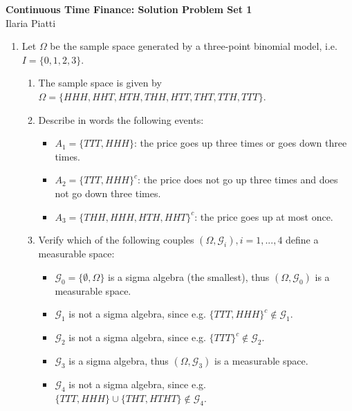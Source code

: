 \documentclass[11pt,a4,table]{article}
\begin{document}
\vspace*{-0.7in}

\begin{center}
 \textbf{Continuous Time Finance: Solution Problem Set 1} \\
Ilaria Piatti
\end{center} 


\begin{enumerate}
    \item Let $\Omega$ be the sample space generated by a three-point binomial model, i.e. $I=\{0,1,2,3\}$.
    
    \begin{enumerate}
        \item The sample space is given by $\Omega=\{HHH,HHT,HTH,THH,HTT, THT, TTH,TTT\}$.
        
        \item Describe in words the following events:
        \begin{itemize}
            \item $A_1=\{TTT,HHH\}$: the price goes up three times or goes down three times.
            \item $A_2=\{TTT,HHH\}^c$: the price does not go up three times and does not go down three times.
            \item $A_3=\{THH,HHH,HTH,HHT\}^c$: the price goes up at most once.
        \end{itemize}
        
        \item Verify which of the following couples $(\Omega,\mathcal{G}_i), i=1,...,4$ define a measurable space:
        \begin{itemize}
            \item $\mathcal{G}_0=\{\emptyset,\Omega\}$ is a sigma algebra (the smallest), thus $(\Omega, \mathcal{G}_0)$ is a measurable space.
            \item $\mathcal{G}_1$ is not a sigma algebra, since e.g. $\{TTT, HHH\}^c\notin \mathcal{G}_1$.
            \item $\mathcal{G}_2$ is not a sigma algebra, since e.g. $\{TTT\}^c\notin \mathcal{G}_2$.
            \item $\mathcal{G}_3$ is a sigma algebra, thus $(\Omega,\mathcal{G}_3)$ is a measurable space.
            \item $\mathcal{G}_4$ is not a sigma algebra, since e.g. $\{TTT,HHH\}\cup\{THT,HTHT\}\notin \mathcal{G}_4$.
        \end{itemize}
    \end{enumerate}
    

\end{enumerate}
\end{document}
